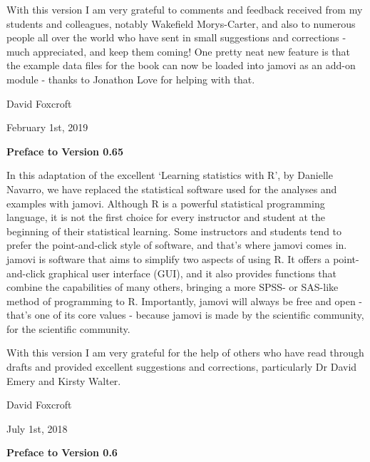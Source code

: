 With this version I am very grateful to comments and feedback received from my students and colleagues, notably Wakefield Morys-Carter, and also to numerous people all over the world who have sent in small suggestions and corrections - much appreciated, and keep them coming! One pretty neat new feature is that the example data files for the book can now be loaded into jamovi as an add-on module - thanks to Jonathon Love for helping with that.

\vspace*{24pt}
\noindent
David Foxcroft 

\noindent
February 1st, 2019

\vspace*{30pt}


\begin{center}{\Large {\bf Preface to Version 0.65}}\end{center}
\vspace*{12pt}

\noindent
In this adaptation of the excellent `Learning statistics with R', by Danielle Navarro, we have replaced the statistical software used for the analyses and examples with jamovi. Although R is a powerful statistical programming language, it is not the first choice for every instructor and student at the beginning of their statistical learning. Some instructors and students tend to prefer the point-and-click style of software, and that's where jamovi comes in. jamovi is software that aims to simplify two aspects of using R. It offers a point-and-click graphical user interface (GUI), and it also provides functions that combine the capabilities of many others, bringing a more SPSS- or SAS-like method of programming to R. Importantly, jamovi will always be free and open - that's one of its core values - because jamovi is made by the scientific community, for the scientific community.

With this version I am very grateful for the help of others who have read through drafts and provided excellent suggestions and corrections, particularly Dr David Emery and Kirsty Walter.

\vspace*{24pt}
\noindent
David Foxcroft 

\noindent
July 1st, 2018

\vspace*{35pt}


\begin{center}{\Large {\bf Preface to Version 0.6}}\end{center}
\vspace*{12pt}

